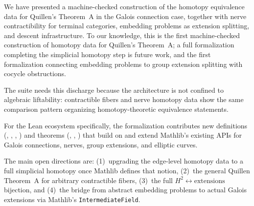 \documentclass[11pt]{article}
\begin{document}
We have presented a machine-checked construction of the homotopy equivalence
data for Quillen's Theorem~A in the Galois connection case, together with
nerve contractibility for terminal categories, embedding problems as extension
splitting, and descent infrastructure. To our knowledge, this is the first machine-checked construction of homotopy data
for Quillen's Theorem~A; a full formalization completing the simplicial homotopy step is future work, and
the first formalization connecting embedding problems to group extension
splitting with cocycle obstructions.

The suite needs this discharge because the architecture is not confined to algebraic
liftability: contractible fibers and nerve homotopy data show the same comparison pattern
organizing homotopy-theoretic equivalence statements.

\begin{sloppypar}
For the Lean ecosystem specifically, the formalization contributes new
definitions (, ,
, ) and theorems
(, ,
) that build on and extend Mathlib's
existing APIs for Galois connections, nerves, group extensions, and elliptic
curves.
\end{sloppypar}

The main open directions are: (1)~upgrading the edge-level homotopy data to a
full simplicial homotopy once Mathlib defines that notion, (2)~the general
Quillen Theorem~A for arbitrary contractible fibers, (3)~the full
$H^2 \leftrightarrow \text{extensions}$ bijection, and (4)~the bridge from
abstract embedding problems to actual Galois extensions via Mathlib's
\texttt{IntermediateField}.
\end{document}
